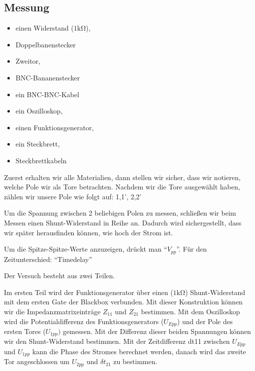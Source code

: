 %
\subsection{Messung}
\label{subsec:3_Messung}
%
%
\begin{itemize}
    \item einen Widerstand ($1\si{\kilo\ohm}$), 
    \item Doppelbanenstecker
    \item Zweitor,
    \item BNC-Bananenstecker
    \item ein BNC-BNC-Kabel 
    \item ein Oszilloskop, 
    \item einen Funktionsgenerator, 
    \item ein Steckbrett,
    \item Steckbrettkabeln
\end{itemize}

Zuerst erhalten wir alle Materialien, dann stellen wir sicher, dass wir notieren, welche Pole wir als Tore betrachten. Nachdem wir die Tore ausgewählt haben, zählen wir unsere Pole wie folgt auf: 1,1', 2,2'

Um die Spannung zwischen 2 beliebigen Polen zu messen, schließen wir beim Messen einen Shunt-Widerstand in Reihe an. Dadurch wird sichergestellt, dass wir später herausfinden können, wie hoch der Strom ist.

Um die Spitze-Spitze-Werte anzuzeigen, drückt man  \enquote{$V_{pp}$}. Für den Zeitunterschied: \enquote{Timedelay}

Der Versuch besteht aus zwei Teilen.
\par Im ersten Teil wird der Funktionsgenerator über einen  ($1\si{\kilo\ohm}$) Shunt-Widerstand mit dem ersten Gate der Blackbox verbunden. Mit dieser Konstruktion können wir die Impedanzmatrixeinträge $Z_{11}$ und $Z_{21}$ bestimmen. Mit dem Oszilloskop wird die Potentialdifferenz des Funktionsgenerators ($U_{Epp}$) und der Pole des ersten Tores ($U_{1pp})$ gemessen. Mit der Differenz dieser beiden Spannungen können wir den Shunt-Widerstand bestimmen. Mit der Zeitdifferenz dt11 zwischen $U_{Epp}$ und $U_{1pp}$ kann die Phase des Stromes berechnet werden, danach wird das zweite Tor angeschlossen um $U_{2pp}$ und $\delta t_{21}$ zu bestimmen.

